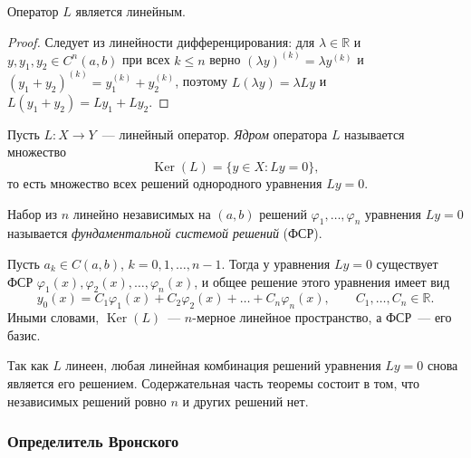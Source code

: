 \documentclass[12pt]{article}
\begin{document}
	\begin{statement}
		Оператор $L$ является линейным.
	\end{statement}

	\begin{proof}
		Следует из линейности дифференцирования: для $\lambda \in \mathbb{R}$ и $y, y_1, y_2 \in C^n(a, b)$ при всех $k \leqslant n$ верно $(\lambda y)^{(k)} = \lambda y^{(k)}$ и $(y_1 + y_2)^{(k)} = y_1^{(k)} + y_2^{(k)}$, поэтому $L(\lambda y) = \lambda Ly$ и $L(y_1 + y_2) = Ly_1 + Ly_2$.
	\end{proof}

	\begin{definition}
		Пусть $L: X \rightarrow Y$~--- линейный оператор. \emph{Ядром} оператора $L$ называется множество
		\[
			\operatorname{Ker}(L) = \{ y \in X : Ly = 0 \},
		\]
		то есть множество всех решений однородного уравнения $Ly = 0$.
	\end{definition}

	\begin{definition}
		Набор из $n$ линейно независимых на $(a, b)$ решений $\varphi_1, \dots, \varphi_n$ уравнения $Ly = 0$ называется \emph{фундаментальной системой решений} (ФСР).
	\end{definition}

	\begin{theorem}
		Пусть $a_k \in C(a, b)$, $k = 0, 1, \dots, n-1$. Тогда у уравнения $Ly = 0$ существует ФСР $\varphi_1(x), \varphi_2(x), \dots, \varphi_n(x)$, и общее решение этого уравнения имеет вид
		\[
			y_0(x) = C_1 \varphi_1(x) + C_2 \varphi_2(x) + \dots + C_n \varphi_n(x), \qquad C_1, \dots, C_n \in \mathbb{R}.
		\]
		Иными словами, $\operatorname{Ker}(L)$~--- $n$-мерное линейное пространство, а ФСР~--- его базис.
	\end{theorem}

	\begin{note}
		Так как $L$ линеен, любая линейная комбинация решений уравнения $Ly = 0$ снова является его решением. Содержательная часть теоремы состоит в том, что независимых решений ровно $n$ и других решений нет.
	\end{note}

	\subsubsection{Определитель Вронского}
\end{document}
